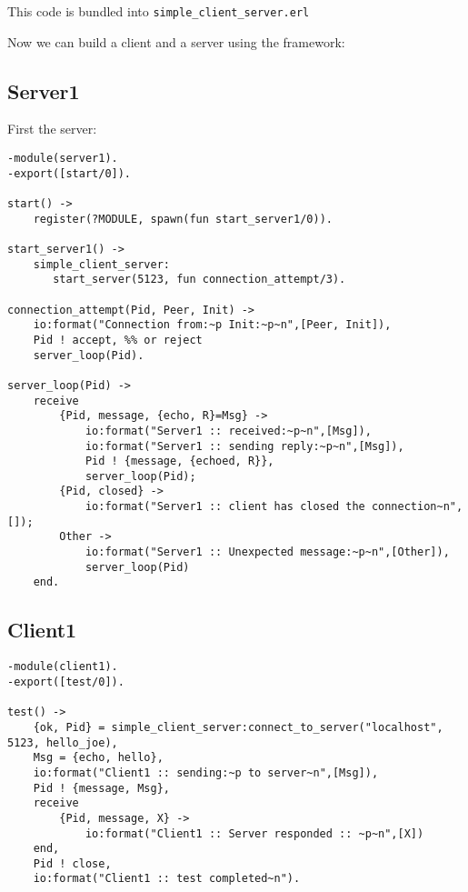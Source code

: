 \documentclass[10pt]{article}
\begin{document}
This code is bundled into \verb+simple_client_server.erl+

Now we can build a client and a server using the framework:

\subsection{Server1}

First the server:

\begin{Verbatim}
-module(server1).
-export([start/0]).

start() ->
    register(?MODULE, spawn(fun start_server1/0)).

start_server1() ->
    simple_client_server:
       start_server(5123, fun connection_attempt/3).

connection_attempt(Pid, Peer, Init) ->
    io:format("Connection from:~p Init:~p~n",[Peer, Init]),
    Pid ! accept, %% or reject
    server_loop(Pid).

server_loop(Pid) ->
    receive
        {Pid, message, {echo, R}=Msg} ->
            io:format("Server1 :: received:~p~n",[Msg]),
            io:format("Server1 :: sending reply:~p~n",[Msg]),
            Pid ! {message, {echoed, R}},
            server_loop(Pid);
        {Pid, closed} ->            
            io:format("Server1 :: client has closed the connection~n",[]);
        Other ->
            io:format("Server1 :: Unexpected message:~p~n",[Other]),
            server_loop(Pid)
    end.
\end{Verbatim}

\subsection{Client1}
\begin{Verbatim}
-module(client1).
-export([test/0]).

test() ->
    {ok, Pid} = simple_client_server:connect_to_server("localhost", 5123, hello_joe), 
    Msg = {echo, hello},
    io:format("Client1 :: sending:~p to server~n",[Msg]),
    Pid ! {message, Msg},
    receive
        {Pid, message, X} ->
            io:format("Client1 :: Server responded :: ~p~n",[X])
    end,
    Pid ! close,
    io:format("Client1 :: test completed~n").
\end{Verbatim}
\end{document}
